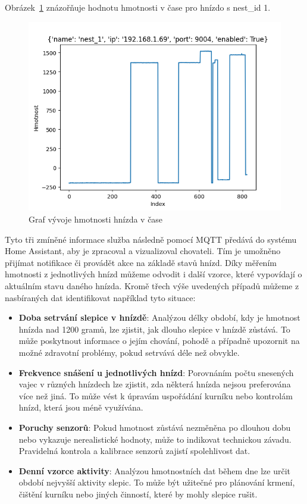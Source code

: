 Obrázek~\ref{fig:weight_egg_chart_timeline} znázořňuje hodnotu hmotnosti v čase pro hnízdo s nest\_id 1.

\begin{figure}[h]
    \centering
    \includegraphics[width=\textwidth]{img/weight_egg_chart_timeline}
    \caption{Graf vývoje hmotnosti hnízda v čase}
    \label{fig:weight_egg_chart_timeline}
\end{figure}

Tyto tři zmíněné informace služba následně pomocí MQTT předává do systému Home Assistant, aby je zpracoval a vizualizoval chovateli.
Tím je umožněno přijímat notifikace či provádět akce na základě stavů hnízd.
Díky měřením hmotnosti z jednotlivých hnízd můžeme odvodit i další vzorce, které vypovídají o aktuálním stavu daného hnízda.
Kromě třech výše uvedených případů můžeme z nasbíraných dat identifikovat například tyto situace:

\begin{itemize}
    \item \textbf{Doba setrvání slepice v hnízdě}: Analýzou délky období, kdy je hmotnost hnízda nad 1200 gramů, lze zjistit, jak dlouho slepice v hnízdě zůstává.
    To může poskytnout informace o jejím chování, pohodě a případně upozornit na možné zdravotní problémy, pokud setrvává déle než obvykle.
    \item \textbf{Frekvence snášení u jednotlivých hnízd}: Porovnáním počtu snesených vajec v různých hnízdech lze zjistit, zda některá hnízda nejsou preferována více než jiná.
    To může vést k úpravám uspořádání kurníku nebo kontrolám hnízd, která jsou méně využívána.
    \item \textbf{Poruchy senzorů}: Pokud hmotnost zůstává nezměněna po dlouhou dobu nebo vykazuje nerealistické hodnoty, může to indikovat technickou závadu.
    Pravidelná kontrola a kalibrace senzorů zajistí spolehlivost dat.
    \item \textbf{Denní vzorce aktivity}: Analýzou hmotnostních dat během dne lze určit období nejvyšší aktivity slepic.
    To může být užitečné pro plánování krmení, čištění kurníku nebo jiných činností, které by mohly slepice rušit.
\end{itemize}


